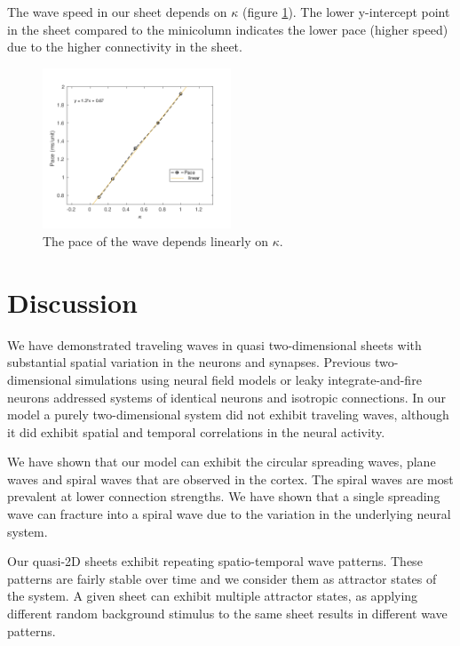 \documentclass[12pt]{article}
\begin{document}
The wave speed in our sheet depends on $\kappa$ (figure \ref{fig:2DWavePaceKappa}).
The lower y-intercept point in the sheet compared to the minicolumn indicates the lower pace (higher speed) due to the higher connectivity in the sheet.
\begin{figure}[!htb]
 \caption{ The pace of the wave depends linearly on $\kappa$.
           }
 \label{fig:2DWavePaceKappa}
 \centering
   \includegraphics[width=0.5\textwidth]{fig/2DWavePace_Kappa}
\end{figure}
\FloatBarrier



\section{Discussion}
We have demonstrated traveling waves in quasi two-dimensional sheets with substantial spatial variation in the neurons and synapses.
Previous two-dimensional simulations using neural field models or leaky integrate-and-fire neurons addressed systems of identical neurons and isotropic connections.
In our model a purely two-dimensional system did not exhibit traveling waves, although it did exhibit spatial and temporal correlations in the neural activity.

We have shown that our model can exhibit the circular spreading waves, plane waves and spiral waves that are observed in the cortex.
The spiral waves are most prevalent at lower connection strengths.
We have shown that a single spreading wave can fracture into a spiral wave due to the variation in the underlying neural system.

Our quasi-2D sheets exhibit repeating spatio-temporal wave patterns.
These patterns are fairly stable over time and we consider them as attractor states of the system.
A given sheet can exhibit multiple attractor states, as applying different random background stimulus to the same sheet results in different wave patterns.
\end{document}
